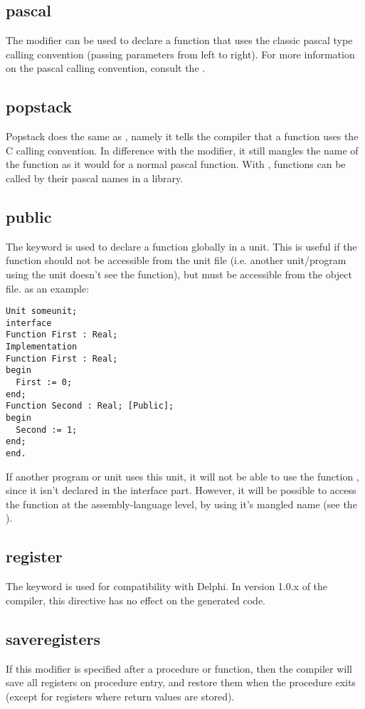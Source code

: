 \subsection{pascal}
\label{se:pascal}
The  modifier can be used to declare a function that uses the
classic pascal type calling convention (passing parameters from left to right).
For more information on the pascal calling convention, consult the \progref.

\subsection{popstack}
\label{se:popstack}
Popstack does the same as , namely it tells the \fpc compiler
that a function uses the C calling convention. In difference with the
 modifier, it still mangles the name of the function as it would
for a normal pascal function.
With , functions can be called by their pascal names in a
library.

\subsection{public}
The  keyword is used to declare a function globally in a unit.
This is useful if the function should not be accessible from the unit
file (i.e. another unit/program using the unit doesn't see the function),
but must be accessible from the object file. as an example:
\begin{verbatim}
Unit someunit;
interface
Function First : Real;
Implementation
Function First : Real;
begin
  First := 0;
end;
Function Second : Real; [Public];
begin
  Second := 1;
end;
end.
\end{verbatim}
If another program or unit uses this unit, it will not be able to use the
function , since it isn't declared in the interface part.
However, it will be possible to access the function  at the
assembly-language level, by using it's mangled name (see the \progref).

\subsection{register}
\label{se:register}
The  keyword is used for compatibility with Delphi. In
version 1.0.x of the compiler, this directive has no effect on the
generated code.

\subsection{saveregisters}
If this modifier is specified after a procedure or function, then the
\fpc compiler will save all registers on procedure entry, and restore
them when the procedure exits (except for registers where return values
are stored).

